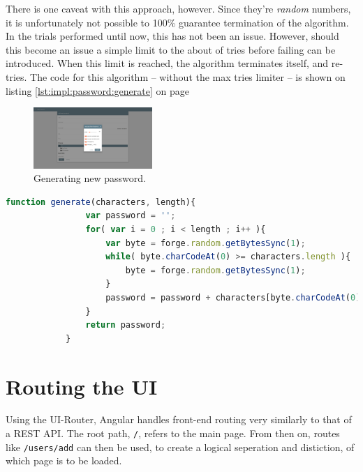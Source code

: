 		There is one caveat with this approach, however. Since they're \emph{random} numbers, it is unfortunately not possible to 100\% guarantee termination of the algorithm. In the trials performed until now, this has not been an issue. However, should this become an issue a simple limit to the about of tries before failing can be introduced. When this limit is reached, the algorithm terminates itself, and re-tries. The code for this algorithm -- without the max tries limiter -- is shown on listing \ref{lst:impl:password:generate} on page \pageref{lst:impl:password:generate}


		\begin{figure}[p]
			\centering
			\includegraphics[width=0.4\textwidth,clip,trim=750 250 750 250]{figures/implementation/screenshots/add-password.png}
			\caption{Generating new password.}
			\label{fig:impl:password:generate}
		\end{figure}

		\begin{lstlisting}[language=Javascript,gobble=12,caption={Generating the password, using the value cut-off method},label={lst:impl:password:generate}]
            function generate(characters, length){
                var password = '';
                for( var i = 0 ; i < length ; i++ ){
                    var byte = forge.random.getBytesSync(1);
                    while( byte.charCodeAt(0) >= characters.length ){
                        byte = forge.random.getBytesSync(1);					
                    }
                    password = password + characters[byte.charCodeAt(0)];
                } 
                return password;
            }	
		\end{lstlisting}

	\section{Routing the UI}
		\label{sec:impl:ui-router}
		Using the UI-Router, Angular handles front-end routing very similarly to that of a REST API. The root path, \verb=/=, refers to the main page. From then on, routes like \verb=/users/add= can then be used, to create a logical seperation and distiction, of which page is to be loaded.

